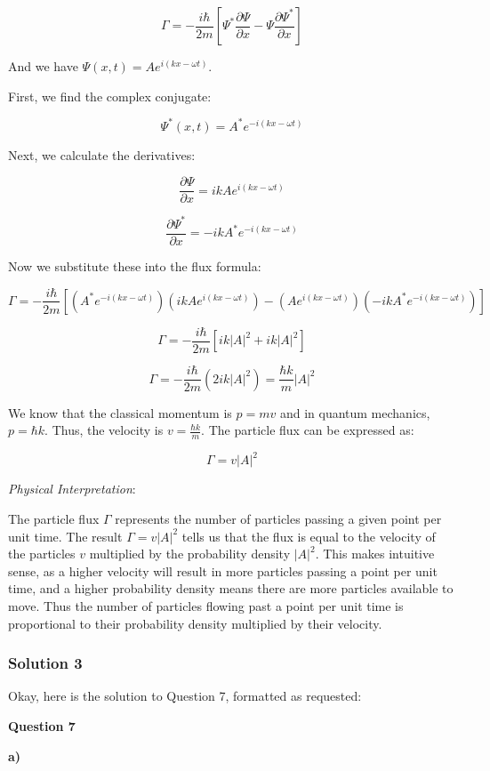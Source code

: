 \documentclass{article}
\begin{document}
\[
\Gamma = -\frac{i \hbar}{2m} \left[ \Psi^* \frac{\partial \Psi}{\partial x} - \Psi \frac{\partial \Psi^*}{\partial x} \right]
\]

And we have $\Psi(x,t) = A e^{i(kx - \omega t)}$.

First, we find the complex conjugate:

\[
\Psi^*(x,t) = A^* e^{-i(kx - \omega t)}
\]

Next, we calculate the derivatives:

\[
\frac{\partial \Psi}{\partial x} = ik A e^{i(kx - \omega t)}
\]

\[
\frac{\partial \Psi^*}{\partial x} = -ik A^* e^{-i(kx - \omega t)}
\]

Now we substitute these into the flux formula:

\[
\Gamma = -\frac{i \hbar}{2m} \left[ (A^* e^{-i(kx - \omega t)})(ik A e^{i(kx - \omega t)}) - (A e^{i(kx - \omega t)})(-ik A^* e^{-i(kx - \omega t)}) \right]
\]

\[
\Gamma = -\frac{i \hbar}{2m} \left[ ik |A|^2 + ik |A|^2 \right]
\]

\[
\Gamma = -\frac{i \hbar}{2m} (2ik |A|^2) = \frac{\hbar k}{m} |A|^2
\]

We know that the classical momentum is $p = mv$ and in quantum mechanics, $p = \hbar k$. Thus, the velocity is $v = \frac{\hbar k}{m}$. The particle flux can be expressed as:

\[
\Gamma = v |A|^2
\]

\textit{Physical Interpretation}:

The particle flux $\Gamma$ represents the number of particles passing a given point per unit time. The result $\Gamma = v |A|^2$ tells us that the flux is equal to the velocity of the particles $v$ multiplied by the probability density $|A|^2$.  This makes intuitive sense, as a higher velocity will result in more particles passing a point per unit time, and a higher probability density means there are more particles available to move. Thus the number of particles flowing past a point per unit time is proportional to their probability density multiplied by their velocity.


\subsubsection{Solution 3}
Okay, here is the solution to Question 7, formatted as requested:

\textbf{Question 7}

\textbf{a)}
\end{document}
